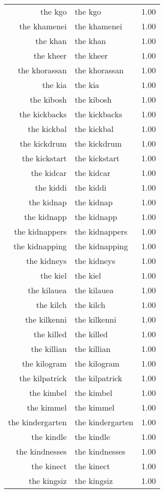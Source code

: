 \begin{table}[ht]
\begin{tabular}{rlr}
  the kgo & the kgo & 1.00 \\ 
  the khamenei & the khamenei & 1.00 \\ 
  the khan & the khan & 1.00 \\ 
  the kheer & the kheer & 1.00 \\ 
  the khorassan & the khorassan & 1.00 \\ 
  the kia & the kia & 1.00 \\ 
  the kibosh & the kibosh & 1.00 \\ 
  the kickbacks & the kickbacks & 1.00 \\ 
  the kickbal & the kickbal & 1.00 \\ 
  the kickdrum & the kickdrum & 1.00 \\ 
  the kickstart & the kickstart & 1.00 \\ 
  the kidcar & the kidcar & 1.00 \\ 
  the kiddi & the kiddi & 1.00 \\ 
  the kidnap & the kidnap & 1.00 \\ 
  the kidnapp & the kidnapp & 1.00 \\ 
  the kidnappers & the kidnappers & 1.00 \\ 
  the kidnapping & the kidnapping & 1.00 \\ 
  the kidneys & the kidneys & 1.00 \\ 
  the kiel & the kiel & 1.00 \\ 
  the kilauea & the kilauea & 1.00 \\ 
  the kilch & the kilch & 1.00 \\ 
  the kilkenni & the kilkenni & 1.00 \\ 
  the killed & the killed & 1.00 \\ 
  the killian & the killian & 1.00 \\ 
  the kilogram & the kilogram & 1.00 \\ 
  the kilpatrick & the kilpatrick & 1.00 \\ 
  the kimbel & the kimbel & 1.00 \\ 
  the kimmel & the kimmel & 1.00 \\ 
  the kindergarten & the kindergarten & 1.00 \\ 
  the kindle & the kindle & 1.00 \\ 
  the kindnesses & the kindnesses & 1.00 \\ 
  the kinect & the kinect & 1.00 \\ 
  the kingsiz & the kingsiz & 1.00 \\ 

\end{tabular}
\end{table}

